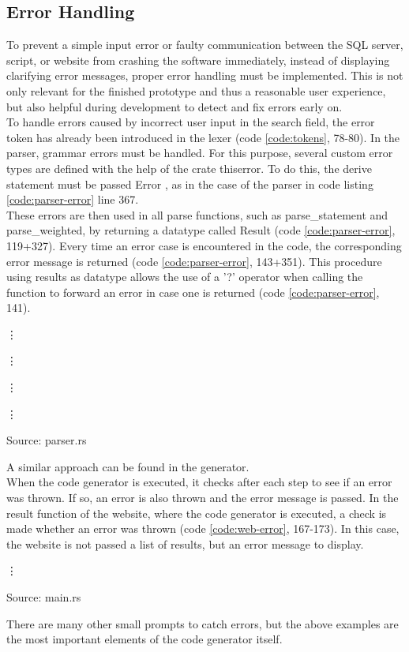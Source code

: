 \subsection{Error Handling}
To prevent a simple input error or faulty communication between the \ac{SQL} server, script, or website from crashing the software immediately, instead of displaying clarifying error messages, proper error handling must be implemented. This is not only relevant for the finished prototype and thus a reasonable user experience, but also helpful during development to detect and fix errors early on.\\
To handle errors caused by incorrect user input in the search field, the error token has already been introduced in the lexer (code \ref{code:tokens}, 78-80). In the parser, grammar errors must be handled. For this purpose, several custom error types are defined with the help of the crate thiserror. To do this, the derive statement must be passed Error \parencite[cf.][n.p.]{tolnay_thiserror_2019}, as in the case of the parser in code listing \ref{code:parser-error} line 367.\\
These errors are then used in all parse functions, such as parse\_statement and parse\_weighted, by returning a datatype called Result (code \ref{code:parser-error}, 119+327). Every time an error case is encountered in the code, the corresponding error message is returned (code \ref{code:parser-error}, 143+351). This procedure using results as datatype allows the use of a '?' operator when calling the function to forward an error in case one is returned (code \ref{code:parser-error}, 141).
\begin{codeenv}
    \label{code:parser-error}
    
    \vdots
    
    \vdots
    
    \vdots
    
    \vdots
    
    \centerline{Source: parser.rs}
\end{codeenv}
A similar approach can be found in the generator.\\
When the code generator is executed, it checks after each step to see if an error was thrown. If so, an error is also thrown and the error message is passed. In the result function of the website, where the code generator is executed, a check is made whether an error was thrown (code \ref{code:web-error}, 167-173). In this case, the website is not passed a list of results, but an error message to display.
\begin{codeenv}
    \label{code:web-error}
    
    \vdots
    
    \centerline{Source: main.rs}
\end{codeenv}
There are many other small prompts to catch errors, but the above examples are the most important elements of the code generator itself.